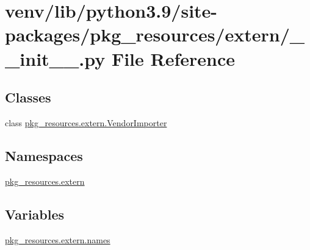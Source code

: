\hypertarget{venv_2lib_2python3_89_2site-packages_2pkg__resources_2extern_2____init_____8py}{}\section{venv/lib/python3.9/site-\/packages/pkg\+\_\+resources/extern/\+\_\+\+\_\+init\+\_\+\+\_\+.py File Reference}
\label{venv_2lib_2python3_89_2site-packages_2pkg__resources_2extern_2____init_____8py}
\subsection*{Classes}
\begin{DoxyCompactItemize}
\item 
class \hyperlink{classpkg__resources_1_1extern_1_1VendorImporter}{pkg\+\_\+resources.\+extern.\+Vendor\+Importer}
\end{DoxyCompactItemize}
\subsection*{Namespaces}
\begin{DoxyCompactItemize}
\item 
 \hyperlink{namespacepkg__resources_1_1extern}{pkg\+\_\+resources.\+extern}
\end{DoxyCompactItemize}
\subsection*{Variables}
\begin{DoxyCompactItemize}
\item 
\hyperlink{namespacepkg__resources_1_1extern_a4c3108bfff5b2cf0862c5614d703ba84}{pkg\+\_\+resources.\+extern.\+names}
\end{DoxyCompactItemize}
